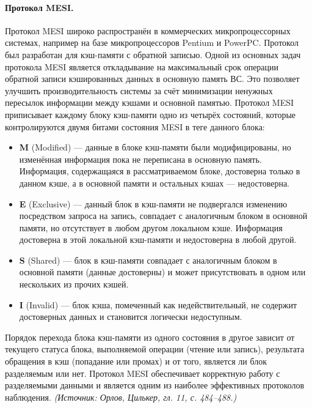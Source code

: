 \documentclass[a4paper,12pt]{article}
\begin{document}
\paragraph{Протокол MESI.}
Протокол MESI широко распространён в коммерческих микропроцессорных системах, например на базе микропроцессоров Pentium и PowerPC. Протокол был разработан для кэш-памяти с обратной записью. Одной из основных задач протокола MESI является откладывание на максимальный срок операции обратной записи кэшированных данных в основную память ВС. Это позволяет улучшить производительность системы за счёт минимизации ненужных пересылок информации между кэшами и основной памятью. Протокол MESI приписывает каждому блоку кэш-памяти одно из четырёх состояний, которые контролируются двумя битами состояния MESI в теге данного блока:
\begin{itemize}
\item \textbf{M} (Modified) --- данные в блоке кэш-памяти были модифицированы, но изменённая информация пока не переписана в основную память. Информация, содержащаяся в рассматриваемом блоке, достоверна только в данном кэше, а в основной памяти и остальных кэшах --- недостоверна.
\item \textbf{E} (Exclusive) --- данный блок в кэш-памяти не подвергался изменению посредством запроса на запись, совпадает с аналогичным блоком в основной памяти, но отсутствует в любом другом локальном кэше. Информация достоверна в этой локальной кэш-памяти и недостоверна в любой другой.
\item \textbf{S} (Shared) --- блок в кэш-памяти совпадает с аналогичным блоком в основной памяти (данные достоверны) и может присутствовать в одном или нескольких из прочих кэшей.
\item \textbf{I} (Invalid) --- блок кэша, помеченный как недействительный, не содержит достоверных данных и становится логически недоступным.
\end{itemize}
Порядок перехода блока кэш-памяти из одного состояния в другое зависит от текущего статуса блока, выполняемой операции (чтение или запись), результата обращения в кэш (попадание или промах) и от того, является ли блок разделяемым или нет. Протокол MESI обеспечивает корректную работу с разделяемыми данными и является одним из наиболее эффективных протоколов наблюдения.
\textit{(Источник: Орлов, Цилькер, гл. 11, с. 484--488.)}
\end{document}
